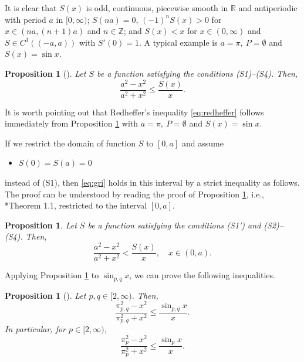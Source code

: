 \documentclass[12pt]{amsart}
\numberwithin{equation}{section}
\theoremstyle{plain}
\newtheorem{prop}[thm]{Proposition}
\theoremstyle{definition}
\theoremstyle{remark}
\begin{document}
It is clear that $S(x)$ is odd, continuous, piecewise smooth 
in $\mathbb{R}$ and 
antiperiodic with period $a$ in $[0,\infty)$; $S(na)=0$, 
$(-1)^nS(x)>0$ for $x \in (na,(n+1)a)$ and $n \in \mathbb{Z}$;
and $S(x)<x$ for $x \in (0,\infty)$ 
and $S \in C^1((-a,a))$ with $S'(0)=1$.
A typical example is $a=\pi,\ P=\emptyset$ and $S(x)=\sin{x}$.

\begin{prop}[\cite{OT2021}]
\label{thm:GRI}
Let $S$ be a function satisfying the conditions {\rm (S1)--(S4)}. Then,
\begin{equation}
\label{eq:gri}
\frac{a^2-x^2}{a^2+x^2} \leq \frac{S(x)}{x}.
\end{equation}
\end{prop}

It is worth pointing out that Redheffer's inequality \eqref{eq:redheffer} 
follows immediately from 
Proposition \ref{thm:GRI} with $a=\pi,\ P=\emptyset$ and $S(x)=\sin{x}$.

If we restrict the domain of function $S$ to $[0,a]$ and assume
\begin{itemize}
\item[(S1')] $S(0)=S(a)=0$
\end{itemize}
instead of (S1),
then \eqref{eq:gri} holds in this interval by a strict inequality
as follows.
The proof can be understood by reading the proof of Proposition \ref{thm:GRI}, i.e., \cite{OT2021}*{Theorem 1.1}, restricted to the interval $[0,a]$.

\begin{prop}
\label{cor:GRI}
Let $S$ be a function satisfying the conditions {\rm(S1')} and {\rm (S2)--(S4)}. Then,
\begin{equation*}
\frac{a^2-x^2}{a^2+x^2} < \frac{S(x)}{x}, \quad x \in (0,a).
\end{equation*}
\end{prop}

Applying Proposition \ref{thm:GRI} to $\sin_{p,q}{x}$, we can prove 
the following inequalities.

\begin{prop}[\cite{OT2021}]
\label{thm:GRI2}
Let $p,q \in [2,\infty)$. Then,
\begin{equation}
\label{eq:GRI}
\frac{\pi_{p,q}^2-x^2}{\pi_{p,q}^2+x^2} \leq \frac{\sin_{p,q}{x}}{x}.
\end{equation}
In particular, for $p \in [2,\infty)$,
\begin{equation*}
\frac{\pi_{p}^2-x^2}{\pi_{p}^2+x^2} \leq \frac{\sin_{p}{x}}{x}.
\end{equation*}
\end{prop}
\end{document}
